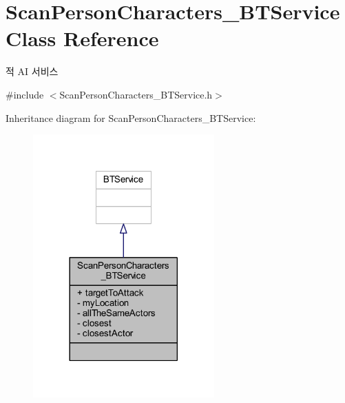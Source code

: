 \hypertarget{class_scan_person_characters___b_t_service}{}\section{Scan\+Person\+Characters\+\_\+\+B\+T\+Service Class Reference}
\label{class_scan_person_characters___b_t_service}


적 AI 서비스  




{\ttfamily \#include $<$Scan\+Person\+Characters\+\_\+\+B\+T\+Service.\+h$>$}



Inheritance diagram for Scan\+Person\+Characters\+\_\+\+B\+T\+Service\+:
\nopagebreak
\begin{figure}[H]
\begin{center}
\leavevmode
\includegraphics[width=197pt]{class_scan_person_characters___b_t_service__inherit__graph}
\end{center}
\end{figure}


